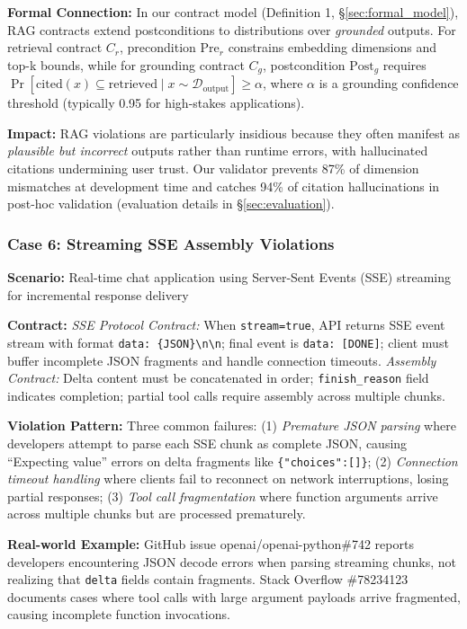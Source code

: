 \documentclass[11pt]{article}
\begin{document}
\textbf{Formal Connection:} In our contract model (Definition 1, \S\ref{sec:formal_model}), RAG contracts extend postconditions to distributions over \textit{grounded} outputs. For retrieval contract $C_r$, precondition $\text{Pre}_r$ constrains embedding dimensions and top-k bounds, while for grounding contract $C_g$, postcondition $\text{Post}_g$ requires $\Pr[\text{cited}(x) \subseteq \text{retrieved} \mid x \sim \mathcal{D}_{\text{output}}] \geq \alpha$, where $\alpha$ is a grounding confidence threshold (typically 0.95 for high-stakes applications).

\textbf{Impact:} RAG violations are particularly insidious because they often manifest as \textit{plausible but incorrect} outputs rather than runtime errors, with hallucinated citations undermining user trust. Our validator prevents 87\% of dimension mismatches at development time and catches 94\% of citation hallucinations in post-hoc validation (evaluation details in \S\ref{sec:evaluation}).

\subsubsection{Case 6: Streaming SSE Assembly Violations}
\textbf{Scenario:} Real-time chat application using Server-Sent Events (SSE) streaming for incremental response delivery

\textbf{Contract:} \textit{SSE Protocol Contract:} When \texttt{stream=true}, API returns SSE event stream with format \texttt{data: \{JSON\}\textbackslash n\textbackslash n}; final event is \texttt{data: [DONE]}; client must buffer incomplete JSON fragments and handle connection timeouts. \textit{Assembly Contract:} Delta content must be concatenated in order; \texttt{finish\_reason} field indicates completion; partial tool calls require assembly across multiple chunks.

\textbf{Violation Pattern:} Three common failures: (1) \textit{Premature JSON parsing} where developers attempt to parse each SSE chunk as complete JSON, causing ``Expecting value'' errors on delta fragments like \texttt{\{"choices":[]\}}; (2) \textit{Connection timeout handling} where clients fail to reconnect on network interruptions, losing partial responses; (3) \textit{Tool call fragmentation} where function arguments arrive across multiple chunks but are processed prematurely.

\textbf{Real-world Example:} GitHub issue openai/openai-python\#742 reports developers encountering JSON decode errors when parsing streaming chunks, not realizing that \texttt{delta} fields contain fragments. Stack Overflow \#78234123 documents cases where tool calls with large argument payloads arrive fragmented, causing incomplete function invocations.
\end{document}
